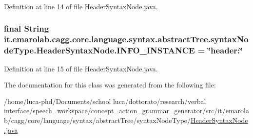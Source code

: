 Definition at line 14 of file Header\-Syntax\-Node.\-java.

\hypertarget{classit_1_1emarolab_1_1cagg_1_1core_1_1language_1_1syntax_1_1abstractTree_1_1syntaxNodeType_1_1HeaderSyntaxNode_a7bb1dfc17eed6788ec06c5d5d7478fac}{
\subsubsection[{I\-N\-F\-O\-\_\-\-I\-N\-S\-T\-A\-N\-C\-E}]{\setlength{\rightskip}{0pt plus 5cm}final String it.\-emarolab.\-cagg.\-core.\-language.\-syntax.\-abstract\-Tree.\-syntax\-Node\-Type.\-Header\-Syntax\-Node.\-I\-N\-F\-O\-\_\-\-I\-N\-S\-T\-A\-N\-C\-E = \char`\"{}header\-:\char`\"{}\hspace{0.3cm}{\ttfamily [static]}}}\label{classit_1_1emarolab_1_1cagg_1_1core_1_1language_1_1syntax_1_1abstractTree_1_1syntaxNodeType_1_1HeaderSyntaxNode_a7bb1dfc17eed6788ec06c5d5d7478fac}


Definition at line 15 of file Header\-Syntax\-Node.\-java.



The documentation for this class was generated from the following file\-:\begin{DoxyCompactItemize}
\item 
/home/luca-\/phd/\-Documents/school luca/dottorato/research/verbal interface/speech\-\_\-workspace/concept\-\_\-action\-\_\-grammar\-\_\-generator/src/it/emarolab/cagg/core/language/syntax/abstract\-Tree/syntax\-Node\-Type/\hyperlink{HeaderSyntaxNode_8java}{Header\-Syntax\-Node.\-java}\end{DoxyCompactItemize}
